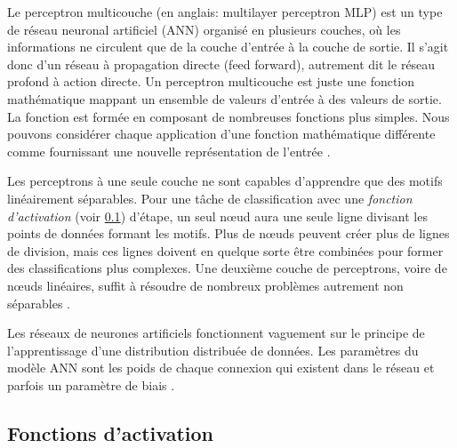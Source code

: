	Le perceptron multicouche (en anglais: multilayer perceptron MLP) est un type de réseau neuronal artificiel (ANN) organisé en plusieurs couches, où les informations ne circulent que de la couche d'entrée à la couche de sortie. Il s'agit donc d'un réseau à propagation directe (feed forward), autrement dit le réseau profond à action directe. Un perceptron multicouche est juste une fonction mathématique mappant un ensemble de valeurs d'entrée à des valeurs de sortie. La fonction est formée en composant de nombreuses fonctions plus simples. Nous pouvons considérer chaque application d'une fonction mathématique différente comme fournissant une nouvelle représentation de l'entrée \cite{goodfellow2016deep,antoine2018apprentissage}.
	
	Les perceptrons à une seule couche ne sont capables d'apprendre que des motifs linéairement séparables. Pour une tâche de classification avec une \textit{fonction d'activation} (voir \ref{sec:activation_weight}) d'étape, un seul nœud aura une seule ligne divisant les points de données formant les motifs. Plus de nœuds peuvent créer plus de lignes de division, mais ces lignes doivent en quelque sorte être combinées pour former des classifications plus complexes. Une deuxième couche de perceptrons, voire de nœuds linéaires, suffit à résoudre de nombreux problèmes autrement non séparables \cite{antoine2018apprentissage}.
	
	Les réseaux de neurones artificiels fonctionnent vaguement sur le principe de l'apprentissage d'une distribution distribuée de données.
	Les paramètres du modèle ANN sont les poids de chaque connexion qui existent dans le réseau et parfois un paramètre de biais \cite{sarkar2017practical}.
	
	
	
	\subsection{Fonctions d'activation} \label{sec:activation_weight}
	
	
